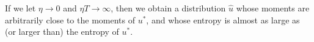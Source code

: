 \documentclass{article}
\begin{document}
If we let $\eta \to 0$ and $\eta T \to \infty$, then we obtain 
a distribution $\hat{u}$ whose moments are arbitrarily close to 
the moments of $u^*$, and whose entropy is almost as large as 
(or larger than) the entropy of $u^*$. 

% 
% 
\end{document}
